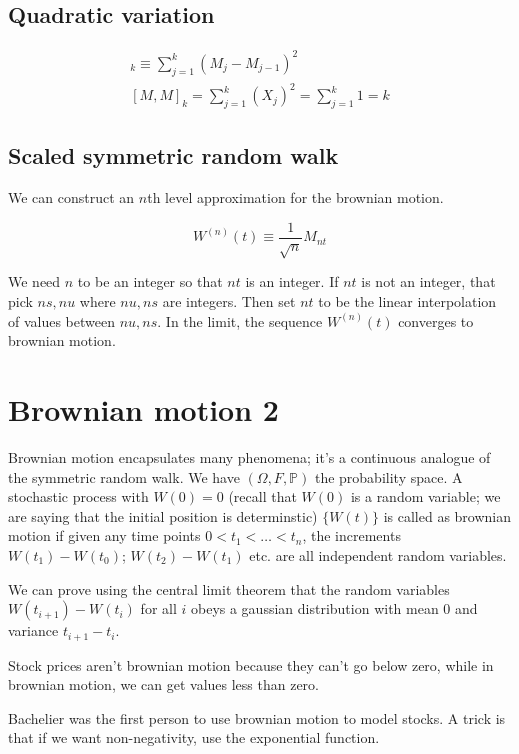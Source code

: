 \documentclass{book}
\renewcommand{\P}{\ensuremath{\mathbb{P}}}
\theoremstyle{definition}
\begin{document}
\section{Quadratic variation}

\begin{align*}
[M, M]_k \equiv \sum_{j=1}^k (M_j - M_{j-1})^2  \\
[M, M]_k = \sum_{j=1}^k (X_j)^2 = \sum_{j=1}^k 1 = k
\end{align*}


\section{Scaled symmetric random walk}

We can construct an $n$th level approximation for the brownian motion.

$$
W^{(n)}(t) \equiv \frac{1}{\sqrt n}M_{nt}
$$

We need $n$ to be an integer so that $nt$ is an integer. If $nt$ is not
an integer, that pick $ns, nu$ where $nu, ns$ are integers. Then set $nt$ to 
be the linear interpolation of values between $nu, ns$. In the limit, the
sequence $W^{(n)}(t)$ converges to brownian motion.

\chapter{Brownian motion 2}

Brownian motion encapsulates many phenomena; it's a continuous analogue
of the symmetric random walk. We have $(\Omega, F, \P)$ the probability space.
A stochastic process with $W(0) = 0$ (recall that $W(0)$ is a random variable; we
are saying that the initial position is determinstic)
$\{ W(t) \}$ is called as brownian motion if  given
any time points $0 < t_1 < \dots < t_n$, the increments $W(t_1) - W(t_0)$; 
$W(t_2) - W(t_1)$ etc. are all independent random variables.

We can prove using the central limit theorem  that the random variables
$W(t_{i+1}) - W(t_i)$ for all $i$ 
obeys a gaussian distribution with mean $0$ and variance $t_{i+1} - t_i$.

Stock prices aren't brownian motion because they can't go below zero, while
in brownian motion, we can get values less than zero. 

Bachelier was the first person to use brownian motion to model stocks.
A trick is that if we want non-negativity, use the exponential function.
\end{document}
